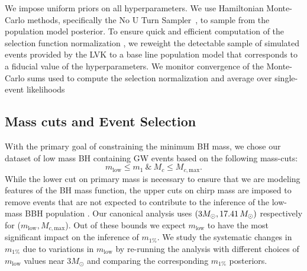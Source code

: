 \documentclass[modern]{aastex631}
\begin{document}
We impose uniform priors on all hyperparameters.  We use Hamiltonian Monte-Carlo
methods, specifically the No U Turn Sampler~\citep[NUTS, ][]{HMC, HMC-NUTS}, to
sample from the population model posterior. To ensure quick and efficient
computation of the selection function normalization \citep{Mandel:2018mve}, we
reweight the detectable sample of simulated events provided by the LVK
\citep{KAGRA:2021duu} to a base line population model that corresponds to a
fiducial value of the hyperparameters.  We monitor convergence of the
Monte-Carlo sums used to compute the selection normalization and average over
single-event likelihoods \citep{Pdet1-Farr,Pdet2-essick,Talbot2023}

\subsection{Mass cuts and Event Selection}
With the primary goal of constraining the minimum BH mass, we chose our dataset of low mass BH containing GW events based on the following mass-cuts:
\begin{equation}
   m_\mathrm{low}\leq m_1 ~\&~M_c\leq M_{c,\mathrm{max}}.
\end{equation}
While the lower cut on primary mass is necessary to ensure that we are modeling
features of the BH mass function, the upper cuts on chirp mass are
imposed to remove events that are not expected to contribute to the inference of
the low-mass BBH population . \chreplaced[id=W]{}{} Our canonical analysis uses $(3M_{\odot},
17.41 \, M_\odot)$ respectively for ($m_\mathrm{low},
M_{c,\mathrm{max}}$). Out of these bounds we expect $m_\mathrm{low}$ to
have the most significant impact on the inference of $m_{1\%}$. We study the
systematic changes in $m_{1\%}$ due to variations in $m_\mathrm{low}$ by re-running the analysis with different choices of $m_\mathrm{low}$ values near $3M_{\odot}$ and comparing the
corresponding $m_{1\%}$ posteriors.
\end{document}
